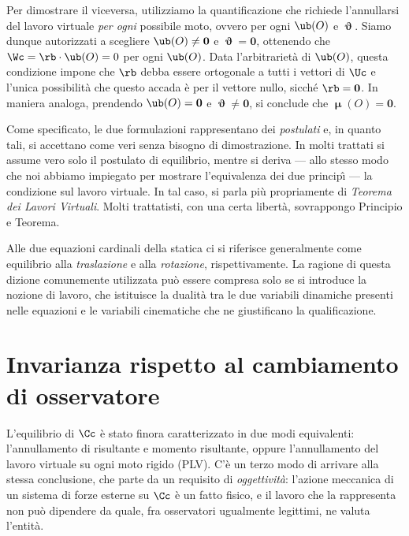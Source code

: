 Per dimostrare il viceversa, utilizziamo la quantificazione che richiede l'annullarsi del 
lavoro virtuale \textit{per ogni} possibile moto, ovvero per ogni $\ub(O)$ e
$\bm{\upvartheta}$. Siamo dunque autorizzati a scegliere $\ub(O)\neq \mathbf{0}$ e
$\bm{\upvartheta}=\mathbf{0}$, ottenendo che $\Wc=\rb\cdot \ub(O)=0$ per ogni $\ub(O)$. 
Data l'arbitrarietà di  $\ub(O)$, questa condizione impone che $\rb$ debba essere ortogonale
a tutti i vettori di $\Uc$ e l'unica possibilità che questo accada è per il vettore nullo, sicché $\rb=\mathbf{0}$.
In maniera analoga, prendendo $\ub(O)= \mathbf{0}$ e
$\bm{\upvartheta}\neq\mathbf{0}$, si conclude che $ \bm{\upmu}(O)=\mathbf{0}$.


\begin{oss}
Come specificato, le due formulazioni rappresentano  dei \textit{postulati} e, in quanto tali, si accettano come veri senza bisogno di dimostrazione. 
In molti trattati si assume vero solo il postulato di equilibrio, mentre si deriva --- allo stesso modo che noi abbiamo impiegato
per mostrare l'equivalenza dei due princip\^{\i} --- la condizione sul lavoro virtuale. In tal caso, si parla più propriamente di \textit{Teorema dei Lavori Virtuali}. Molti trattatisti,
con una certa libertà, sovrappongo Principio e Teorema.
\end{oss}

\begin{oss}
Alle due equazioni cardinali della statica ci si riferisce generalmente come equilibrio alla \textit{traslazione} e alla \textit{rotazione}, rispettivamente.
La ragione di questa dizione comunemente utilizzata può essere compresa solo se si introduce la nozione di lavoro, che  istituisce la dualità tra 
le due variabili dinamiche presenti nelle equazioni e le variabili cinematiche che ne giustificano la qualificazione.

\end{oss}



\section{Invarianza rispetto al cambiamento di osservatore}\label{sec:invarianza_osservatore}

L'equilibrio di $\Cc$ è stato finora caratterizzato in due modi equivalenti: l'annullamento di risultante e
momento risultante, oppure l'annullamento del lavoro
virtuale su ogni moto rigido (PLV). C'è un terzo modo di arrivare alla
stessa conclusione, che  parte da un requisito di
\textit{oggettività}: l'azione meccanica di un sistema di forze esterne su
$\Cc$ è un fatto fisico, e il lavoro che la rappresenta non può dipendere
da quale, fra osservatori ugualmente legittimi, ne valuta l'entità.

